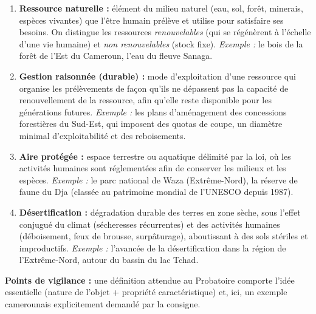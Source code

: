 \documentclass[11pt]{article}
\begin{document}
\begin{corrige}
\begin{enumerate}
\item \textbf{Ressource naturelle :} élément du milieu naturel (eau, sol, forêt, minerais, espèces vivantes) que l'être humain prélève et utilise pour satisfaire ses besoins. On distingue les ressources \emph{renouvelables} (qui se régénèrent à l'échelle d'une vie humaine) et \emph{non renouvelables} (stock fixe). \emph{Exemple :} le bois de la forêt de l'Est du Cameroun, l'eau du fleuve Sanaga.
\item \textbf{Gestion raisonnée (durable) :} mode d'exploitation d'une ressource qui organise les prélèvements de façon qu'ils ne dépassent pas la capacité de renouvellement de la ressource, afin qu'elle reste disponible pour les générations futures. \emph{Exemple :} les plans d'aménagement des concessions forestières du Sud-Est, qui imposent des quotas de coupe, un diamètre minimal d'exploitabilité et des reboisements.
\item \textbf{Aire protégée :} espace terrestre ou aquatique délimité par la loi, où les activités humaines sont réglementées afin de conserver les milieux et les espèces. \emph{Exemple :} le parc national de Waza (Extrême-Nord), la réserve de faune du Dja (classée au patrimoine mondial de l'UNESCO depuis 1987).
\item \textbf{Désertification :} dégradation durable des terres en zone sèche, sous l'effet conjugué du climat (sécheresses récurrentes) et des activités humaines (déboisement, feux de brousse, surpâturage), aboutissant à des sols stériles et improductifs. \emph{Exemple :} l'avancée de la désertification dans la région de l'Extrême-Nord, autour du bassin du lac Tchad.
\end{enumerate}
\textbf{Points de vigilance :} une définition attendue au Probatoire comporte l'idée essentielle (nature de l'objet + propriété caractéristique) et, ici, un exemple camerounais explicitement demandé par la consigne.
\end{corrige}
\end{document}
